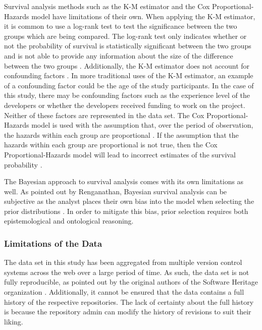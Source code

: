 \documentclass[acmconf]{acmart}
\begin{document}
Survival analysis methods such as the K-M estimator and the Cox Proportional-Hazards model have limitations of their own.
When applying the K-M estimator, it is common to use a log-rank test to test the significance between the two groups which are being compared.
The log-rank test only indicates whether or not the probability of survival is statistically significant between the two groups and is not able to provide any information about the size of the difference between the two groups \cite{stel2011kaplan}.
Additionally, the K-M estimator does not account for confounding factors \cite{stel2011kaplan}.
In more traditional uses of the K-M estimator, an example of a confounding factor could be the age of the study participants.
In the case of this study, there may be confounding factors such as the experience level of the developers or whether the developers received funding to work on the project.
Neither of these factors are represented in the data set.
The Cox Proportional-Hazards model is used with the assumption that, over the period of observation, the hazards within each group are proportional \cite{stel2011cox}.
If the assumption that the hazards within each group are proportional is not true, then the Cox Proportional-Hazards model will lead to incorrect estimates of the survival probability \cite{stel2011cox}. 

The Bayesian approach to survival analysis comes with its own limitations as well.
As pointed out by Renganathan, Bayesian survival analysis can be subjective as the analyst places their own bias into the model when selecting the prior distributions \cite{renganathan2016overview}.
In order to mitigate this bias, prior selection requires both epistemological and ontological reasoning. 

\subsubsection{Limitations of the Data}

The data set in this study has been aggregated from multiple version control systems across the web over a large period of time.
As such, the data set is not fully reproducible, as pointed out by the original authors of the Software Heritage organization \cite{pietri2019software}.
Additionally, it cannot be ensured that the data contains a full history of the respective repositories.
The lack of certainty about the full history is because the repository admin can modify the history of revisions to suit their liking.
\end{document}

